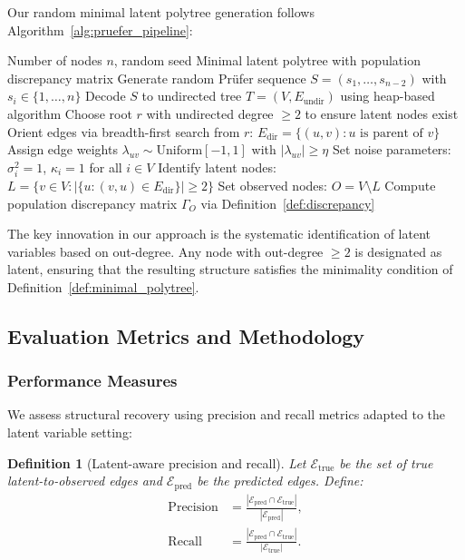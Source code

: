 \documentclass[11pt,a4paper]{article}
\numberwithin{equation}{section}
\newtheorem{definition}[theorem]{Definition}
\begin{document}
Our random minimal latent polytree generation follows Algorithm~\ref{alg:pruefer_pipeline}:

\begin{algorithm}[H]
\caption{Prüfer-Based Population Random Polytree Generation}
\label{alg:pruefer_pipeline}
\begin{algorithmic}[1]
    \Require Number of nodes $n$, random seed
    \Ensure Minimal latent polytree with population discrepancy matrix
    \State Generate random Prüfer sequence $S = (s_1, \ldots, s_{n-2})$ with $s_i \in \{1,\ldots,n\}$
    \State Decode $S$ to undirected tree $T = (V, E_{\text{undir}})$ using heap-based algorithm
    \State Choose root $r$ with undirected degree $\geq 2$ to ensure latent nodes exist
    \State Orient edges via breadth-first search from $r$: $E_{\text{dir}} = \{(u,v) : u \text{ is parent of } v\}$
    \State Assign edge weights $\lambda_{uv} \sim \text{Uniform}[-1,1]$ with $|\lambda_{uv}| \geq \eta$
    \State Set noise parameters: $\sigma_i^2 = 1$, $\kappa_i = 1$ for all $i \in V$
    \State Identify latent nodes: $L = \{v \in V : |\{u : (v,u) \in E_{\text{dir}}\}| \geq 2\}$
    \State Set observed nodes: $O = V \setminus L$
    \State Compute population discrepancy matrix $\Gamma_O$ via Definition~\ref{def:discrepancy}
\end{algorithmic}
\end{algorithm}

The key innovation in our approach is the systematic identification of latent variables based on out-degree. Any node with out-degree $\geq 2$ is designated as latent, ensuring that the resulting structure satisfies the minimality condition of Definition~\ref{def:minimal_polytree}.


\subsection{Evaluation Metrics and Methodology}

\subsubsection{Performance Measures}

We assess structural recovery using precision and recall metrics adapted to the latent variable setting:

\begin{definition}[Latent-aware precision and recall]
Let $\mathcal{E}_{\text{true}}$ be the set of true latent-to-observed edges and $\mathcal{E}_{\text{pred}}$ be the predicted edges. Define:
\begin{align}
\text{Precision} &= \frac{|\mathcal{E}_{\text{pred}} \cap \mathcal{E}_{\text{true}}|}{|\mathcal{E}_{\text{pred}}|}, \\
\text{Recall} &= \frac{|\mathcal{E}_{\text{pred}} \cap \mathcal{E}_{\text{true}}|}{|\mathcal{E}_{\text{true}}|}.
\end{align}
\end{definition}
\end{document}
